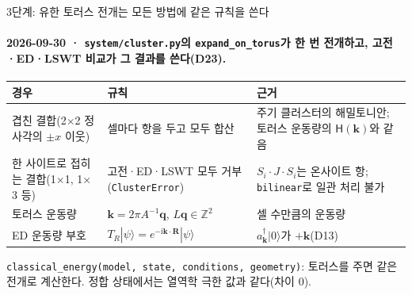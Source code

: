 \begin{frame}[label=stage3-torus-rules]{3단계: 유한 토러스 전개는 모든 방법에 같은 규칙을 쓴다}
  \framesubtitle{2026-09-30 · \texttt{system/cluster.py}의 \texttt{expand\_on\_torus}가 한 번 전개하고, 고전·ED·LSWT 비교가 그 결과를 쓴다(D23).}
  \small
  \begin{tabularx}{\textwidth}{@{}P{2.9cm}YP{2.6cm}@{}}
    \toprule
    경우 & 규칙 & 근거 \\
    \midrule
    겹친 결합(2$\times$2 정사각의 $\pm x$ 이웃) & 셀마다 항을 두고 모두 합산 & 주기 클러스터의 해밀토니안; 토러스 운동량의 $\mathsf H(\mathbf k)$와 같음 \\
    한 사이트로 접히는 결합(1$\times$1, 1$\times$3 등) & 고전·ED·LSWT 모두 거부(\texttt{ClusterError}) & $S_i\!\cdot\!J\!\cdot\!S_i$는 온사이트 항; \texttt{bilinear}로 일관 처리 불가 \\
    토러스 운동량 & $\mathbf k=2\pi A^{-1}\mathbf q$, $L\mathbf q\in\mathbb Z^2$ & 셀 수만큼의 운동량 \\
    ED 운동량 부호 & $T_R|\psi\rangle=e^{-\mathrm i\mathbf k\cdot\mathbf R}|\psi\rangle$ & $a_{\mathbf k}^\dagger|0\rangle$가 $+\mathbf k$(D13) \\
    \bottomrule
  \end{tabularx}
  \par\medskip
  \texttt{classical\_energy(model, state, conditions, geometry)}: 토러스를 주면 같은 전개로 계산한다. 정합 상태에서는 열역학 극한 값과 같다(차이 0).
  \par\medskip
\end{frame}

